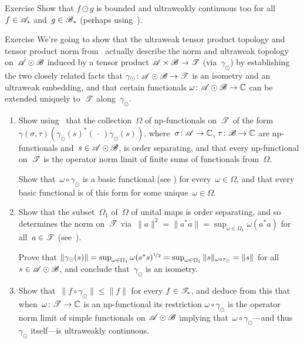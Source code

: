 \documentclass[a]{subfiles}
\begin{document}
\begin{parsec}
\begin{point}{Exercise}
Show that $f\odot g$ is
bounded and ultraweakly continuous too
for all~$f\in\mathscr{A}_*$ and~$g\in\mathscr{B}_*$
(perhaps using~).
\end{point}
\begin{point}{Exercise}%
We're going to show that 
the ultraweak tensor product topology
and tensor product norm from~
actually describe the norm and ultraweak topology
on~$\mathscr{A}\odot\mathscr{B}$ induced by a tensor product
$\mathscr{A}\times\mathscr{B}\to\mathscr{T}$ (via~$\gamma_\odot$)
by establishing
the two closely related facts that
$\gamma_\odot\colon\mathscr{A}\odot\mathscr{B}\to\mathscr{T}$
is an isometry
and an ultraweak embedding,
and that certain
functionals 
$\omega\colon \mathscr{A}\odot\mathscr{B}\to\mathbb{C}$
can be extended uniquely to~$\mathscr{T}$ along~$\gamma_\odot$.
\begin{enumerate}
\item
Show using~
that the collection~$\Omega$
of np-functionals
on~$\mathscr{T}$ of the form 
$\gamma(\sigma,\tau)(\gamma_\odot(s)^*(\,\cdot\,)\gamma_\odot(s))$,
where~$\sigma\colon \mathscr{A}\to\mathbb{C}$,
$\tau\colon \mathscr{B}\to\mathbb{C}$
are np-functionals
and~$s\in\mathscr{A}\odot\mathscr{B}$,
is order separating,
and that
every np-functional on~$\mathscr{T}$
is the operator norm limit of finite sums
of functionals from~$\Omega$.

Show that~$\omega\circ \gamma_\odot$ is a basic functional
(see )
for every~$\omega\in\Omega$,
and that every basic functional is of this form
for some unique~$\omega\in\Omega$.

\item
Show that the subset~$\Omega_1$ of~$\Omega$
of unital maps is order separating,
and so determines the norm on~$\mathscr{T}$
via~$\|a\|^2=\|a^*a\| = \sup_{\omega\in\Omega_1} \omega(a^*a)$
for all~$a\in\mathscr{T}$
(see~).

Prove that $\|\gamma_\odot(s)\|
=\sup_{\omega\in\Omega_1} \omega(s^*s)^{\nicefrac{1}{2}}
=\sup_{\omega\in\Omega_1}
\|s\|_{\omega\circ \tau_\odot}=\|s\|$
for all~$s\in\mathscr{A}\odot\mathscr{B}$,
and 
conclude
that~$\gamma_\odot$ is an isometry.

\item
Show that~$\|f\circ\gamma_\odot\|\leq \|f\|$
for every $f\in\mathscr{T}_*$,
and deduce from this
that when~$\omega\colon \mathscr{T}\to\mathbb{C}$
is an np-functional
its restriction $\omega\circ\gamma_\odot$
is the operator norm limit
of simple functionals on~$\mathscr{A}\odot\mathscr{B}$
implying that~$\omega\circ\gamma_\odot$---and
thus $\gamma_\odot$ itself---is ultraweakly continuous.


\end{enumerate}
\end{point}
\end{parsec}
\end{document}
